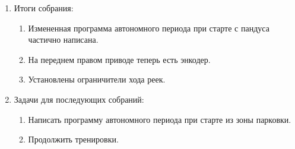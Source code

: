 \begin{enumerate}
\begin{enumerate}
	\end{enumerate}
	
	\item Итоги собрания:
	\begin{enumerate}
		
		\item Измененная программа автономного периода при старте с пандуса частично написана.
		
		\item На переднем правом приводе теперь есть энкодер.
		
        \item Установлены ограничители хода реек.
		
	\end{enumerate}
	
	\item Задачи для последующих собраний:
	\begin{enumerate}
		
		\item Написать программу автономного периода при старте из зоны парковки.
		
		\item Продолжить тренировки.
			
	\end{enumerate}
\end{enumerate}
\fillpage
